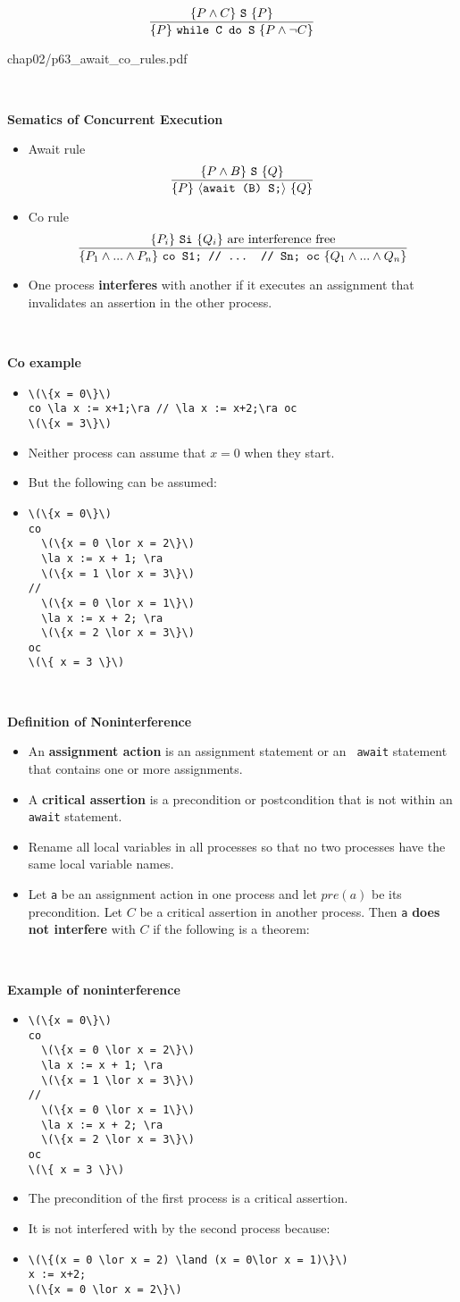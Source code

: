 \documentclass{article}
\newcommand{\myfig}[1]{\begin{overpic}[scale=1.5]{#1}}
\newcommand{\myfigend}{\end{overpic}\newpage}
\newcommand{\bi}{\begin{itemize}}
\newcommand{\ii}{\item}
\newcommand{\ei}{\end{itemize}}
\newcommand{\ti}[1]{
\mbox{~}

\vspace{1.25in}
\centerline{\bf #1}}
\newcommand{\la}{\ensuremath{\langle}}
\newcommand{\ra}{\ensuremath{\rangle}}
\begin{document}
\[
\frac{\{P\land C\}\ \mbox{\tt S}\ \{P\}}{\{P\}\ \mbox{\tt while C do S}\ \{P\land\neg C\}}
\]

\newpage

\myfig{chap02/p63_await_co_rules.pdf}
\myfigend

\ti{Sematics of Concurrent Execution}
\bi
\ii Await rule
\[
\frac{\stm{P\land B}{S}{Q}}{\stm{P}{\la await (B) S;\ra}{Q}}
\]
\ii Co rule
\[
\frac{\{P_i\}\ \mbox{\tt Si}\ \{Q_i\}\mbox{\ are interference free}}
     {\{P_1\land ... \land P_n\}\ \mbox{\tt co S1; // ... // Sn; oc}\ \{Q_1\land ... \land Q_n\}}
\]
\ii One process {\bf interferes} with another if it executes an
assignment that invalidates an assertion in the other process. 
\ei

\newpage
\ti{Co example}
\bi
\ii
\begin{Verbatim}
\(\{x = 0\}\)
co \la x := x+1;\ra // \la x := x+2;\ra oc
\(\{x = 3\}\)
\end{Verbatim}
\ii Neither process can assume that $x=0$ when they start.
\ii But the following can be assumed:
\ii
\begin{Verbatim}
\(\{x = 0\}\)
co 
  \(\{x = 0 \lor x = 2\}\)
  \la x := x + 1; \ra
  \(\{x = 1 \lor x = 3\}\)
//
  \(\{x = 0 \lor x = 1\}\)
  \la x := x + 2; \ra
  \(\{x = 2 \lor x = 3\}\)
oc
\(\{ x = 3 \}\)
\end{Verbatim}
\ei

\newpage
\ti{Definition of Noninterference}
\bi
\ii An {\bf assignment action} is an assignment statement or an {\tt
  await} statement that contains one or more assignments.
\ii A {\bf critical assertion} is a precondition or postcondition that
is not within an {\tt await} statement.
\ii Rename all local variables in all processes so that no two
processes have the same local variable names.
\ii Let {\tt a} be an assignment action in one process and let $pre(a)$ be its precondition.  Let $C$ be a critical assertion in
another process.  Then {\tt a} {\bf does not interfere} with $C$ if the
following is a theorem:
\centerline{}
\ei
\newpage

\ti{Example of noninterference}
\bi
\ii
\begin{Verbatim}
\(\{x = 0\}\)
co 
  \(\{x = 0 \lor x = 2\}\)
  \la x := x + 1; \ra
  \(\{x = 1 \lor x = 3\}\)
//
  \(\{x = 0 \lor x = 1\}\)
  \la x := x + 2; \ra
  \(\{x = 2 \lor x = 3\}\)
oc
\(\{ x = 3 \}\)
\end{Verbatim}
\ii The precondition of the first process is a critical assertion.
\ii It is not interfered with by the second process because:
\ii
\begin{Verbatim}
\(\{(x = 0 \lor x = 2) \land (x = 0\lor x = 1)\}\)
x := x+2;
\(\{x = 0 \lor x = 2\}\)
\end{Verbatim}
\ei
\newpage
\end{document}
